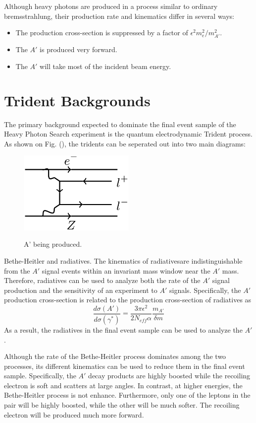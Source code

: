 Although heavy photons are produced in a process similar to ordinary bremsstrahlung, 
their production rate and kinematics differ in several ways: 
\begin{itemize}
    \item The production cross-section is suppressed by a factor of $\epsilon^{2}m_{e}^{2}/m_{A'}^{2}$.
    \item The $A'$ is produced very forward.
    \item The $A'$ will take most of the incident beam energy.
\end{itemize}

\section{Trident Backgrounds}

The primary background expected to dominate the final event sample of the Heavy
Photon Search experiment is the quantum electrodynamic Trident process.  As 
shown on Fig. (), the tridents can be seperated out into two main diagrams: 
\begin{figure}[t]
    \centering
    \caption{A' being produced.}
    \includegraphics[width=0.5\textwidth]{images/bethe-heitler.png}
    \label{fig:tridents}
\end{figure}  
Bethe-Heitler and radiatives. The kinematics of radiativesare indistinguishable
from the $A'$ signal events within an invariant mass window near the $A'$ mass.
Therefore, radiatives can be used to analyze both the rate of the $A'$ signal 
production and the sensitivity of an experiment to $A'$ signals.  Specifically,
the $A'$ production cross-section is related to the production cross-section of 
radiatives as 
\[
    \frac{d\sigma(A')}{d\sigma(\gamma^*)} = \frac{3\pi\epsilon^{2}}{2 N_{eff} \alpha}
        \frac{m_{A'}}{\delta m}
\]
As a result, the radiatives in the final event sample can be used to analyze 
the $A'$.

Although the rate of the Bethe-Heitler process dominates among the two processes, 
its different kinematics can be used to reduce them in the final event sample.
Specifically, the $A'$ decay products are highly boosted while the recoiling 
electron is soft and scatters at large angles.  In contrast, at higher 
energies, the Bethe-Heitler process is not enhance.  Furthermore, only one of
the leptons in the pair will be highly boosted, while the other will be much
softer.  The recoiling electron will be produced much more forward.


